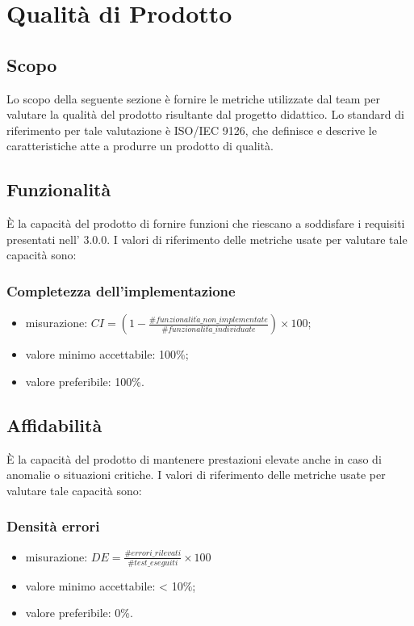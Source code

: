 \section{Qualità di Prodotto}
\subsection{Scopo}
Lo scopo della seguente sezione è fornire le metriche utilizzate dal team \Gruppo{} per valutare la qualità del prodotto risultante dal progetto didattico. Lo standard di riferimento per tale valutazione è ISO/IEC 9126, che definisce e descrive le caratteristiche atte a produrre un prodotto di qualità.

\subsection{Funzionalità}
È la capacità del prodotto di fornire funzioni che riescano a soddisfare i requisiti presentati nell'\textit{\AdR} 3.0.0.
I valori di riferimento delle metriche usate per valutare tale capacità sono:

	\subsubsection*{Completezza dell'implementazione}
	\begin{itemize}
	\item{misurazione: $CI = (1- \displaystyle\frac{\#funzionalit\grave{a}\_non\_implementate}{\#funzionalit\grave{a}\_individuate})\times100$};
	\item {valore minimo accettabile: 100\%;}
	\item {valore preferibile: 100\%.}
	\end{itemize}
	
\subsection{Affidabilità}
È la capacità del prodotto di mantenere prestazioni elevate anche in caso di anomalie o situazioni critiche.
I valori di riferimento delle metriche usate per valutare tale capacità sono:

	\subsubsection*{Densità errori}
	\begin{itemize}
		\item{misurazione: $DE = \displaystyle\frac{\#errori\_rilevati}{\#test\_eseguiti}\times100$}
		\item {valore minimo accettabile: < 10\%;}
		\item {valore preferibile: 0\%.}
	\end{itemize}

